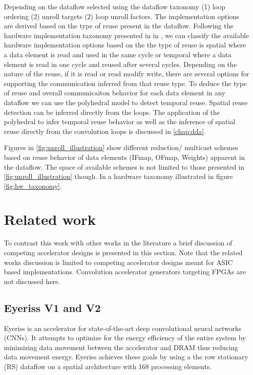 Depending on the dataflow selected using the dataflow taxonomy (1) loop ordering
(2) unroll targets (2) loop unroll factors. The implementation options are
derived based on the type of reuse present in the dataflow. Following the
hardware implementation taxonomy presented in in \cite{maestro}, we can classify
the available hardware implementation options based on the the type of reuse is
spatial where a data element is read and used in the same cycle or temporal
where a data element is read in one cycle and reused after several cycles.
Depending on the nature of the reuse, if it is read or read modify write, there
are several options for supporting the communication inferred from that reuse
type. To deduce the type of reuse and overall communicaiton behavior for each
data element in any dataflow we can use the polyhedral model to detect temporal
reuse. Spatial reuse detection can be inferred directly from the loops. The
application of the polyhedral to infer temporal reuse behavior as well as the
inference of spatial reuse directly from the convolution loops is discussed in
\autoref{chap:dda}.

Figures in \autoref{fig:unroll_illustration} show different reduction/ multicast
schemes based on reuse behavior of data elements (IFmap, OFmap, Weights)
apparent in the dataflow. The space of available schemes is not limited to those
presented in \autoref{fig:unroll_illustration} though. In \cite{maestro} a
hardware taxonomy illustrated in figure \autoref{fig:hw_taxonomy}.

\section{Related work}
\label{chap:related_work}

To contrast this work with other works in the literature a brief discussion of
competing accelerator designs is presented in this section. Note that the
related works discussion is limited to competing accelerator designs meant for
ASIC based implementations. Convolution accelerator generators targeting FPGAs
are not discussed here.

\subsection{Eyeriss V1 and V2}
\label{chap:related_work:eyeriss}

Eyeriss \cite{isscc_2016_chen_eyeriss} is an accelerator for state-of-the-art
deep convolutional neural networks (CNNs). It attempts to optimize for the
energy efficiency of the entire system by minimizing data movement between the
accelerator and DRAM thus reducing data movement energy. Eyeriss achieves these
goals by using a the row stationary (RS) dataflow on a spatial architecture with
168 processing elements. 

